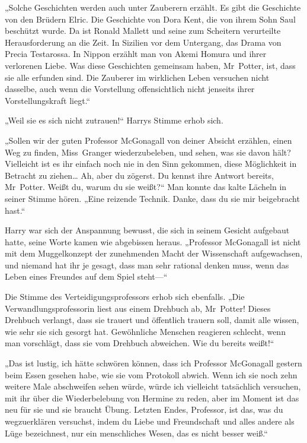 {„Solche Geschichten werden auch unter Zauberern erzählt. Es gibt die Geschichte von den Brüdern Elric. Die Geschichte von Dora Kent, die von ihrem Sohn Saul beschützt wurde. Da ist Ronald Mallett und seine zum Scheitern verurteilte Herausforderung an die Zeit. In Sizilien vor dem Untergang, das Drama von Precia Testarossa. In Nippon erzählt man von Akemi Homura und ihrer verlorenen Liebe. Was diese Geschichten gemeinsam haben, Mr~Potter, ist, dass sie alle erfunden sind. Die Zauberer im wirklichen Leben versuchen nicht dasselbe, auch wenn die Vorstellung offensichtlich nicht jenseits ihrer Vorstellungskraft liegt.“

„Weil sie es sich nicht zutrauen!“ Harrys Stimme erhob sich.

„Sollen wir der guten Professor McGonagall von deiner Absicht erzählen, einen Weg zu finden, Miss~Granger wiederzubeleben, und sehen, was sie davon hält? Vielleicht ist es ihr einfach noch nie in den Sinn gekommen, diese Möglichkeit in Betracht zu ziehen… Ah, aber du zögerst. Du kennst ihre Antwort bereits, Mr~Potter. Weißt du, warum du sie weißt?“ Man konnte das kalte Lächeln in seiner Stimme hören. „Eine reizende Technik. Danke, dass du sie mir beigebracht hast.“

Harry war sich der Anspannung bewusst, die sich in seinem Gesicht aufgebaut hatte, seine Worte kamen wie abgebissen heraus. „Professor McGonagall ist nicht mit dem Muggelkonzept der zunehmenden Macht der Wissenschaft aufgewachsen, und niemand hat ihr je gesagt, dass man sehr rational denken muss, wenn das Leben eines Freundes auf dem Spiel steht—“

Die Stimme des Verteidigungsprofessors erhob sich ebenfalls. „Die Verwandlungsprofessorin liest aus einem Drehbuch ab, Mr~Potter! Dieses Drehbuch verlangt, dass sie trauert und öffentlich trauern soll, damit alle wissen, wie sehr sie sich gesorgt hat. Gewöhnliche Menschen reagieren schlecht, wenn man vorschlägt, dass sie vom Drehbuch abweichen. Wie du bereits weißt!“

„Das ist lustig, ich hätte schwören können, dass ich Professor McGonagall gestern beim Essen gesehen habe, wie sie vom Protokoll abwich. Wenn ich sie noch zehn weitere Male abschweifen sehen würde, würde ich vielleicht tatsächlich versuchen, mit ihr über die Wiederbelebung von Hermine zu reden, aber im Moment ist das neu für sie und sie braucht Übung. Letzten Endes, Professor, ist das, was du wegzuerklären versuchst, indem du Liebe und Freundschaft und alles andere als Lüge bezeichnest, nur ein menschliches Wesen, das es nicht besser weiß.“

}
